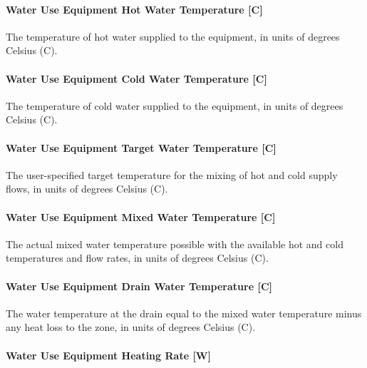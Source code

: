 \paragraph{Water Use Equipment Hot Water Temperature {[}C{]}}\label{water-use-equipment-hot-water-temperature-c}

The temperature of hot water supplied to the equipment, in units of degrees Celsius (C).

\paragraph{Water Use Equipment Cold Water Temperature {[}C{]}}\label{water-use-equipment-cold-water-temperature-c}

The temperature of cold water supplied to the equipment, in units of degrees Celsius (C).

\paragraph{Water Use Equipment Target Water Temperature {[}C{]}}\label{water-use-equipment-target-water-temperature-c}

The user-specified target temperature for the mixing of hot and cold supply flows, in units of degrees Celsius (C).

\paragraph{Water Use Equipment Mixed Water Temperature {[}C{]}}\label{water-use-equipment-mixed-water-temperature-c}

The actual mixed water temperature possible with the available hot and cold temperatures and flow rates, in units of degrees Celsius (C).

\paragraph{Water Use Equipment Drain Water Temperature {[}C{]}}\label{water-use-equipment-drain-water-temperature-c}

The water temperature at the drain equal to the mixed water temperature minus any heat loss to the zone, in units of degrees Celsius (C).

\paragraph{Water Use Equipment Heating Rate {[}W{]}}\label{water-use-equipment-heating-rate-w}

